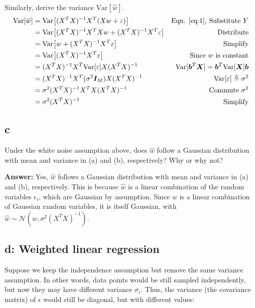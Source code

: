 \documentclass{article}
\begin{document}
Similarly, derive the variance $\text{Var}\left[\hat{w}\right]$.
\begin{align*}
    \text{Var}\left[\hat{w}\right] &= \text{Var}\left[(X^TX)^{-1}X^T\left(Xw + \epsilon\right)\right]&\text{Eqn. \ref{eq:1}, Substitute $Y$}\\
    &= \text{Var}\left[(X^TX)^{-1}X^TXw + (X^TX)^{-1}X^T\epsilon\right]&\text{Distribute}\\
    &= \text{Var}\left[w + (X^TX)^{-1}X^T\epsilon\right]&\text{Simplify}\\
    &= \text{Var}\left[(X^TX)^{-1}X^T\epsilon\right]&\text{Since $w$ is constant}\\
    &= (X^TX)^{-1}X^T\text{Var}\left[\epsilon\right]X(X^TX)^{-1}&\text{$\text{Var}[\vct{b}^T\mtx{X}] = \vct{b}^T\text{Var}[\mtx{X}]\vct{b}$}\\
    &= (X^TX)^{-1}X^T(\sigma^2\mtx{I}_M)X(X^TX)^{-1}&\text{$\text{Var}\left[\epsilon\right] \triangleq \sigma^2$}\\
    &= \sigma^2(X^TX)^{-1}X^TX(X^TX)^{-1}&\text{Commute $\sigma^2$}\\
    &= \sigma^2(X^TX)^{-1}&\text{Simplify}\\
\end{align*}

\subsection{c}

Under the white noise assumption above, does $\hat{w}$ follow a Gaussian distribution with mean and variance in (a) and (b), respectively?
Why or why not?

\textbf{Answer:} Yes, $\hat{w}$ follows a Gaussian distribution with mean and variance in (a) and (b), respectively.
This is because $\hat{w}$ is a linear combination of the random variables $\epsilon_i$, which are Gaussian by assumption.
Since $\hat{w}$ is a linear combination of Gaussian random variables, it is itself Gaussian, with $\hat{w} \sim \mathcal{N}(w, \sigma^2(X^TX)^{-1})$.

\subsection{d: Weighted linear regression}
Suppose we keep the independence assumption but remove the same variance assumption.
In other words, data points would be still sampled independently, but now they may have different variance $\sigma_i$.
Thus, the variance (the covariance matrix) of $\epsilon$ would still be diagonal, but with different values:
\end{document}
